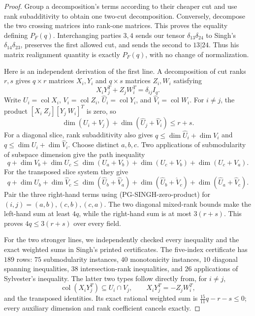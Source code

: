 \begin{proof}
Group a decomposition's terms according to their cheaper cut
and use rank subadditivity to obtain one two-cut decomposition.
Conversely, decompose the two crossing matrices into rank-one
matrices. This proves the equality defining $P_F(q)$.
Interchanging parties $3,4$ sends our tensor $\delta_{13}\delta_{24}$
to Singh's $\delta_{14}\delta_{23}$, preserves the first allowed
cut, and sends the second to $13|24$. Thus his matrix realignment
quantity is exactly $P_F(q)$, with no change of normalization.

Here is an independent derivation of the first line. A decomposition
of cut ranks $r,s$ gives $q\times r$ matrices $X_i,Y_i$ and
$q\times s$ matrices $Z_i,W_i$ satisfying
\[
 X_iY_j^T+Z_jW_i^T=\delta_{ij}I_q.
 \tag{PG-SINGH-slices}
\]
Write $U_i=\operatorname{col}X_i$, $V_i=\operatorname{col}Z_i$,
$\widehat U_i=\operatorname{col}Y_i$, and
$\widehat V_i=\operatorname{col}W_i$. For $i\ne j$, the product
$[X_i\ Z_j][Y_j\ W_i]^T$ is zero, so
\[
 \dim(U_i+V_j)+\dim(\widehat U_j+\widehat V_i)\leq r+s.
 \tag{PG-SINGH-zero-product}
\]
For a diagonal slice, rank subadditivity also gives
$q\leq\dim\widehat U_i+\dim V_i$ and
$q\leq\dim U_i+\dim\widehat V_i$.
Choose distinct $a,b,c$. Two applications of submodularity of
subspace dimension give the path inequality
\[
 q+\dim V_b+\dim U_c
 \leq\dim(U_a+V_b)+\dim(U_c+V_b)+\dim(U_c+V_a).
\]
For the transposed slice system they give
\[
 q+\dim\widehat U_b+\dim\widehat V_c
 \leq\dim(\widehat U_b+\widehat V_a)
   +\dim(\widehat U_b+\widehat V_c)
   +\dim(\widehat U_a+\widehat V_c).
\]
Pair the three right-hand terms using
(PG-SINGH-zero-product) for $(i,j)=(a,b),(c,b),(c,a)$.
The two diagonal mixed-rank bounds make the left-hand sum at
least $4q$, while the right-hand sum is at most $3(r+s)$.
This proves $4q\leq3(r+s)$ over every field.

For the two stronger lines, we independently checked every
inequality and the exact weighted sums in Singh's printed
certificates. The five-index certificate has $189$ rows:
$75$ submodularity instances, $40$ monotonicity instances,
$10$ diagonal spanning inequalities, $38$ intersection-rank
inequalities, and $26$ applications of Sylvester's inequality.
The latter two types follow directly from, for $i\ne j$,
\[
 \operatorname{col}(X_iY_j^T)\subseteq U_i\cap V_j,
 \qquad X_iY_j^T=-Z_jW_i^T,
\]
and the transposed identities. Its exact rational weighted sum is
$\tfrac{15}{11}q-r-s\leq0$; every auxiliary dimension and rank
coefficient cancels exactly.


\end{proof}
